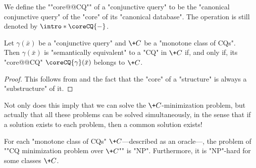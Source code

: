 We define the ""core@@CQ"" of a "conjunctive query" to be
the "canonical conjunctive query" of the "core" of its "canonical database".
The operation is still denoted by $\intro*\coreCQ{-}$.
\begin{proposition}
	\AP\label{prop:minimization-CQ}
	Let $\gamma(\bar x)$ be a "conjunctive query" and $\+C$ be
	a "monotone class of CQs". Then $\gamma(\bar x)$ is "semantically equivalent"
	to a "CQ" in $\+C$ if, and only if, its "core@@CQ" $\coreCQ{\gamma}(\bar x)$
	belongs to $\+C$.
\end{proposition}

\begin{proof}
	This follows from 
	and the fact that the "core" of a "structure" is always
	a "substructure" of it.
\end{proof}

Not only does this imply that we can solve the $\+C$-minimization problem,
but actually that all these problems can be solved simultaneously,
in the sense that if a solution exists to each problem, then a common solution exists!


\begin{corollary}
	\label{coro:decision-minimization-cq}
	For each "monotone class of CQs" $\+C$---described as an oracle---,
	the problem of ""CQ minimization problem over $\+C$"" is "NP".
	Furthermore, it is "NP"-hard for some classes $\+C$.
\end{corollary}

